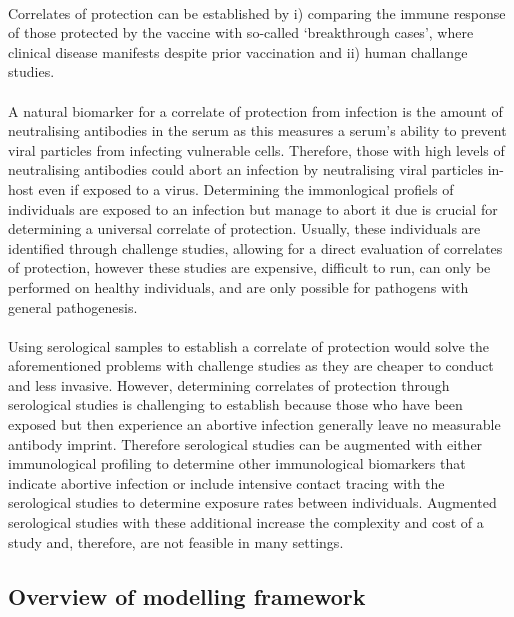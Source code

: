\documentclass{article}
\begin{document}
\paragraph{}Correlates of protection can be established by i) comparing the immune response of those protected by the vaccine with so-called ‘breakthrough cases’, where clinical disease manifests despite prior vaccination and ii) human challange studies.\cite{} 

\paragraph{}A natural biomarker for a correlate of protection from infection is the amount of neutralising antibodies in the serum as this measures a serum's ability to prevent viral particles from infecting vulnerable cells. Therefore, those with high levels of neutralising antibodies could abort an infection by neutralising viral particles in-host even if exposed to a virus. Determining the immonlogical profiels of individuals are exposed to an infection but manage to abort it due is crucial for determining a universal correlate of protection. Usually, these individuals are identified through challenge studies, allowing for a direct evaluation of correlates of protection, however these studies are expensive, difficult to run, can only be performed on healthy individuals, and are only possible for pathogens with general pathogenesis.

\paragraph{}Using serological samples to establish a correlate of protection would solve the aforementioned problems with challenge studies as they are cheaper to conduct and less invasive. However, determining correlates of protection through serological studies is challenging to establish because those who have been exposed but then experience an abortive infection generally leave no measurable antibody imprint. Therefore serological studies can be augmented with either immunological profiling to determine other immunological biomarkers that indicate abortive infection\cite{} or include intensive contact tracing with the serological studies to determine exposure rates between individuals\cite{}. Augmented serological studies with these additional increase the complexity and cost of a study and, therefore, are not feasible in many settings.


\subsection{Overview of modelling framework}
\end{document}
